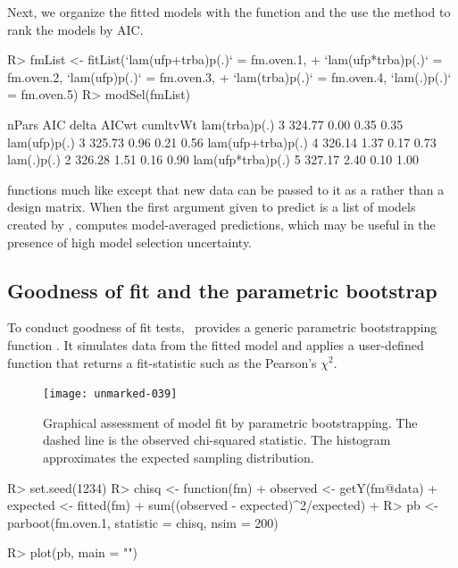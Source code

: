 \documentclass[article,shortnames]{jss}
\newcommand{\um}{\pkg{unmarked}}
\begin{document}
{Next, we organize the fitted models with the  function and
the use the  method to rank the models by AIC.



\begin{Schunk}
\begin{Sinput}
R> fmList <- fitList(`lam(ufp+trba)p(.)` = fm.oven.1, 
+     `lam(ufp*trba)p(.)` = fm.oven.2, `lam(ufp)p(.)` = fm.oven.3, 
+     `lam(trba)p(.)` = fm.oven.4, `lam(.)p(.)` = fm.oven.5)
R> modSel(fmList)
\end{Sinput}
\begin{Soutput}
                  nPars    AIC delta AICwt cumltvWt
lam(trba)p(.)         3 324.77  0.00  0.35     0.35
lam(ufp)p(.)          3 325.73  0.96  0.21     0.56
lam(ufp+trba)p(.)     4 326.14  1.37  0.17     0.73
lam(.)p(.)            2 326.28  1.51  0.16     0.90
lam(ufp*trba)p(.)     5 327.17  2.40  0.10     1.00
\end{Soutput}
\end{Schunk}



 functions much like  except that new data can be
passed to it as a  rather than a design matrix. When the first
argument given to predict is a list of models created by ,
 computes model-averaged predictions, which may be
useful in the presence of high model selection uncertainty.



\subsection{Goodness of fit and the parametric bootstrap}

To conduct goodness of fit tests, \um\ provides a generic parametric
bootstrapping function .  It simulates data from the fitted model and
applies a user-defined function that returns a fit-statistic such as the
Pearson's $\chi^2$.



\begin{figure}[th!]
  \centering
\texttt{[image: unmarked-039]}
\caption{Graphical assessment of model fit by parametric bootstrapping.  The dashed
line is the observed chi-squared statistic. The histogram approximates the
expected sampling distribution.}
\label{fig:pb}
\end{figure}

\begin{Schunk}
\begin{Sinput}
R> set.seed(1234)
R> chisq <- function(fm) {
+     observed <- getY(fm@data)
+     expected <- fitted(fm)
+     sum((observed - expected)^2/expected)
+ }
R> pb <- parboot(fm.oven.1, statistic = chisq, nsim = 200)
\end{Sinput}
\end{Schunk}
\begin{Schunk}
\begin{Sinput}
R> plot(pb, main = "")
\end{Sinput}
\end{Schunk}


}
\end{document}
